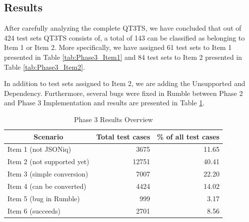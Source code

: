 \subsection{Results}
After carefully analyzing the complete QT3TS, we have concluded that out of 424 test sets QT3TS consists of, a total of 143 can be classified as belonging to Item 1 or Item 2. More specifically, we have assigned 61 test sets to Item 1 presented in Table \ref{tab:Phase3_Item1} and 84 test sets to Item 2 presented in Table \ref{tab:Phase3_Item2}.

In addition to test sets assigned to Item 2, we are adding the Unsupported and Dependency. Furthermore, several bugs were fixed in Rumble between Phase 2 and Phase 3 Implementation and results are presented in Table \ref{tab:Phase3_ResultTable}.
\begin{table}[h!]
	\centering
	\begin{tabular}{|l|r|r|}
		\hline
		\multicolumn{1}{|c|}{Scenario} & \multicolumn{1}{c|}{Total test cases} & \multicolumn{1}{c|}{\% of all test cases} \\ \hline
		Item 1 (not JSONiq)                        & 3675                                  & 11.65                                     \\ \hline
		Item 2 (not supported yet)                        & 12751                                 & 40.41                                     \\ \hline
		Item 3 (simple conversion)                        & 7007                                  & 22.20                                     \\ \hline
		Item 4 (can be converted)                        & 4424                                  & 14.02                                     \\ \hline
		Item 5 (bug in Rumble)                         & 999                                   & 3.17                                      \\ \hline
		Item 6 (succeeds)                        & 2701                                  & 8.56                                      \\ \hline
	\end{tabular}
	\caption{Phase 3 Results Overview}
	\label{tab:Phase3_ResultTable}
\end{table}

